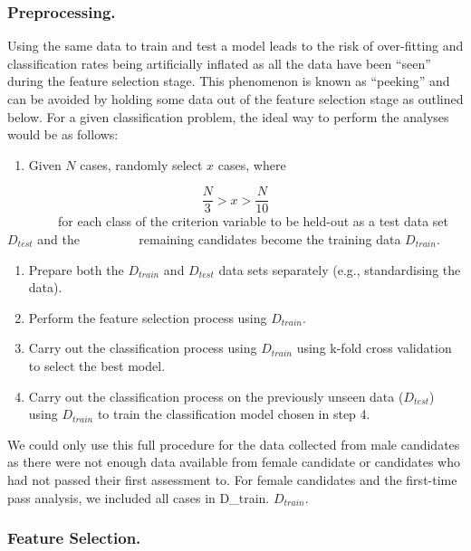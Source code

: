 \documentclass[
  12pt,
  a4paper,
]{book}
\providecommand{\tightlist}{%
  \setlength{\itemsep}{0pt}\setlength{\parskip}{0pt}}
\begin{document}
\hypertarget{preprocessing.}{%
\subsubsection{Preprocessing.}\label{preprocessing.}}

Using the same data to train and test a model leads to the risk of over-fitting and classification rates being artificially inflated as all the data have been ``seen'' during the feature selection stage. This phenomenon is known as ``peeking'' \citep{Kuncheva2018, Reunanen2003a, Smialowski2010} and can be avoided by holding some data out of the feature selection stage as outlined below. For a given classification problem, the ideal way to perform the analyses would be as follows:

\begin{enumerate}
\def\labelenumi{\arabic{enumi}.}
\tightlist
\item
  Given \(N\) cases, randomly select \(x\) cases, where
\end{enumerate}

\[\frac{N}{3} > x > \frac{N}{10}\]
~~~~~~~~for each class of the criterion variable to be held-out as a test data set \(D_{test}\) and the ~~~~~~~~ remaining candidates become the training data \(D_{train}\).

\begin{enumerate}
\def\labelenumi{\arabic{enumi}.}
\setcounter{enumi}{1}
\tightlist
\item
  Prepare both the \(D_{train}\) and \(D_{test}\) data sets separately (e.g., standardising the data).
\item
  Perform the feature selection process using \(D_{train}\).
\item
  Carry out the classification process using \(D_{train}\) using k-fold cross validation to select the best model.
\item
  Carry out the classification process on the previously unseen data (\(D_{test}\)) using \(D_{train}\) to train the classification model chosen in step 4.
\end{enumerate}

We could only use this full procedure for the data collected from male candidates as there were not enough data available from female candidate or candidates who had not passed their first assessment to. For female candidates and the first-time pass analysis, we included all cases in D\_train. \(D_{train}\).

\hypertarget{ml-pra-method-feature-selection}{%
\subsubsection{Feature Selection.}\label{ml-pra-method-feature-selection}}
\end{document}
